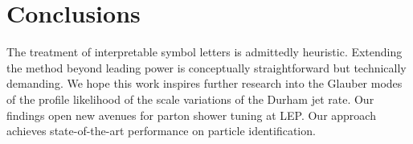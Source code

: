 \section{Conclusions}\label{sec:conclusions}

The treatment of interpretable symbol letters is admittedly heuristic.
Extending the method beyond leading power is conceptually
straightforward but technically demanding. We hope this work inspires
further research into the Glauber modes of the profile likelihood of the
scale variations of the Durham jet rate. Our findings open new avenues
for parton shower tuning at LEP. Our approach achieves state-of-the-art
performance on particle identification.

